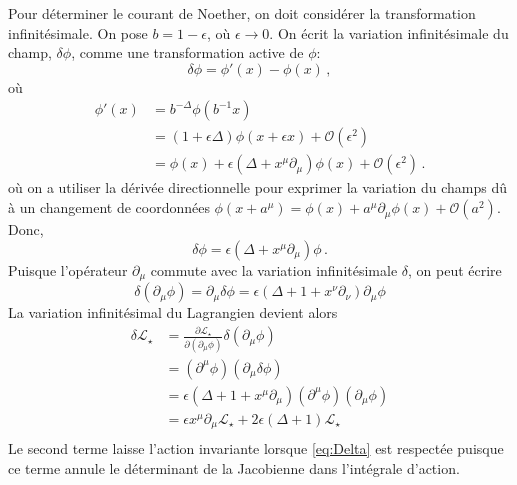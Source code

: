 \documentclass{article}
\numberwithin{equation}{section}
\theoremstyle{solution}
\begin{document}
Pour déterminer le courant de Noether, on doit considérer la transformation infinitésimale. On pose $b = 1 - \epsilon$, où $\epsilon \rightarrow 0$. 
On écrit la variation infinitésimale du champ, $\delta \phi$, comme une transformation active de $\phi$:
\begin{equation}
       \delta \phi = \phi'(x) - \phi(x) \, ,
\end{equation} 
où
\begin{align*}
        \phi'(x) &= b^{-\Delta}\phi(b^{-1}x) \\
              &= (1 + \epsilon\Delta) \phi(x + \epsilon x) + \mathcal{O}(\epsilon^{2}) \\
              &= \phi(x) + \epsilon(\Delta + x^{\mu}\partial_{\mu})\phi(x) + \mathcal{O}(\epsilon^{2})\, .
\end{align*}
où on a utiliser la dérivée directionnelle pour exprimer la variation du champs dû à un changement de coordonnées 
$\phi(x + a^{\mu}) = \phi(x) + a^{\mu}\partial_{\mu}\phi(x) + \mathcal{O}(a^{2})$.
Donc,
\begin{equation}
        \delta \phi = \epsilon(\Delta + x^\mu \partial_\mu)\phi\, .
\end{equation} 
Puisque l'opérateur $\partial_\mu$ commute avec la variation infinitésimale $\delta$, on peut écrire
\begin{equation}
         \delta (\partial_\mu \phi) = \partial_{\mu}\delta\phi =  \epsilon(\Delta + 1 + x^{\nu}\partial_\nu)\partial_\mu \phi 
\end{equation} 
La variation infinitésimal du Lagrangien devient alors
\begin{align*}
        \delta  \mathcal{L}_\star &= \frac{\partial \mathcal{L}_\star}{\partial (\partial_\mu \phi)} \delta (\partial_\mu \phi) \\
                &= (\partial^\mu \phi)(\partial_\mu \delta \phi) \\
                &= \epsilon (\Delta + 1 + x^\mu \partial_\mu)(\partial^\mu \phi) (\partial_\mu \phi) \\
                &= \epsilon  x^\mu \partial_\mu \mathcal{L}_\star + 2\epsilon (\Delta + 1) \mathcal{L}_\star \\
\end{align*}
Le second terme laisse l'action invariante lorsque \eqref{eq:Delta} est respectée puisque ce terme annule le déterminant de la Jacobienne dans l'intégrale d'action. 
\end{document}
